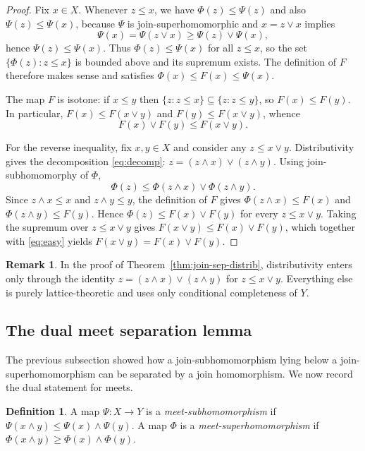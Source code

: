 \documentclass[11pt]{amsart}
\theoremstyle{definition}
\newtheorem{definition}[theorem]{Definition}
\newtheorem{remark}[theorem]{Remark}
\newcommand{\join}{\vee}
\newcommand{\meet}{\wedge}
\begin{document}
\begin{proof}
Fix $x\in X$.
Whenever $z\le x$, we have $\Phi(z)\le \Psi(z)$ and also $\Psi(z)\le \Psi(x)$, because $\Psi$ is join-superhomomorphic and $x=z\join x$ implies
\[
\Psi(x)=\Psi(z\join x)\ge \Psi(z)\join\Psi(x),
\]
hence $\Psi(z)\le \Psi(x)$.
Thus $\Phi(z)\le \Psi(x)$ for all $z\le x$, so the set $\{\Phi(z): z\le x\}$ is bounded above and its supremum exists.
The definition of $F$ therefore makes sense and satisfies $\Phi(x)\le F(x)\le \Psi(x)$.

The map $F$ is isotone: if $x\le y$ then $\{z:z\le x\}\subseteq\{z:z\le y\}$, so $F(x)\le F(y)$.
In particular, $F(x)\le F(x\join y)$ and $F(y)\le F(x\join y)$, whence
\begin{equation}\label{eq:easy}
F(x)\join F(y)\le F(x\join y).
\end{equation}

For the reverse inequality, fix $x,y\in X$ and consider any $z\le x\join y$.
Distributivity gives the decomposition \eqref{eq:decomp}:
$z=(z\meet x)\join(z\meet y)$.
Using join-subhomomorphy of $\Phi$,
\[
\Phi(z)\le \Phi(z\meet x)\join \Phi(z\meet y).
\]
Since $z\meet x\le x$ and $z\meet y\le y$, the definition of $F$ gives
$\Phi(z\meet x)\le F(x)$ and $\Phi(z\meet y)\le F(y)$.
Hence $\Phi(z)\le F(x)\join F(y)$ for every $z\le x\join y$.
Taking the supremum over $z\le x\join y$ gives $F(x\join y)\le F(x)\join F(y)$, which together with \eqref{eq:easy} yields
$F(x\join y)=F(x)\join F(y)$.
\end{proof}

\begin{remark}\label{rem:where-distrib}
In the proof of Theorem~\ref{thm:join-sep-distrib}, distributivity enters only through the identity $z=(z\meet x)\join(z\meet y)$ for $z\le x\join y$.
Everything else is purely lattice-theoretic and uses only conditional completeness of $Y$.
\end{remark}

\subsection{The dual meet separation lemma}
The previous subsection showed how a join-subhomomorphism lying below a join-superhomomorphism
can be separated by a join homomorphism.
We now record the dual statement for meets.

\begin{definition}
A map $\Psi\colon X\to Y$ is a \emph{meet-subhomomorphism} if $\Psi(x\meet y)\le \Psi(x)\meet\Psi(y)$.
A map $\Phi$ is a \emph{meet-superhomomorphism} if $\Phi(x\meet y)\ge \Phi(x)\meet\Phi(y)$.
\end{definition}
\end{document}
